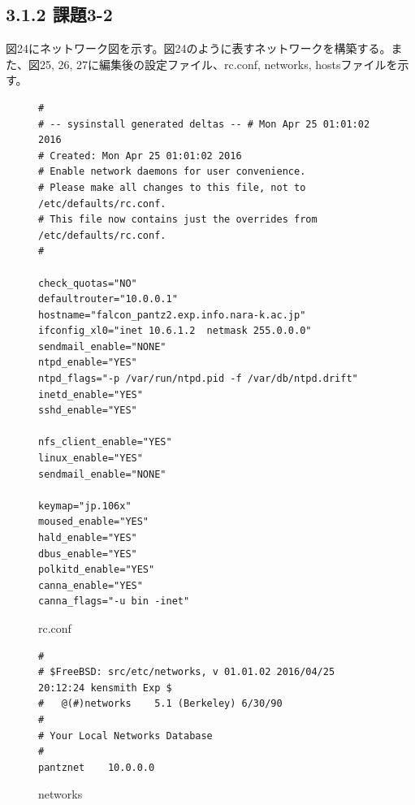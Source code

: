 \documentclass[12pt]{jreport}
\begin{document}
            \subsection*{3.1.2 課題3-2}
                図24にネットワーク図を示す。図24のように表すネットワークを構築する。また、図25, 26, 27に編集後の設定ファイル、rc.conf, networks, hostsファイルを示す。
                \begin{figure}[H]
                    \begin{center}
                        \begin{screen}
                            \begin{verbatim}
#
# -- sysinstall generated deltas -- # Mon Apr 25 01:01:02 2016
# Created: Mon Apr 25 01:01:02 2016 　
# Enable network daemons for user convenience.
# Please make all changes to this file, not to /etc/defaults/rc.conf.
# This file now contains just the overrides from /etc/defaults/rc.conf.
#

check_quotas="NO"
defaultrouter="10.0.0.1"
hostname="falcon_pantz2.exp.info.nara-k.ac.jp"
ifconfig_xl0="inet 10.6.1.2  netmask 255.0.0.0"
sendmail_enable="NONE"
ntpd_enable="YES"
ntpd_flags="-p /var/run/ntpd.pid -f /var/db/ntpd.drift"
inetd_enable="YES"
sshd_enable="YES"

nfs_client_enable="YES"
linux_enable="YES"
sendmail_enable="NONE"

keymap="jp.106x"
moused_enable="YES"
hald_enable="YES"
dbus_enable="YES"
polkitd_enable="YES"
canna_enable="YES"
canna_flags="-u bin -inet"
                            \end{verbatim}
                        \end{screen}
                        \caption{rc.conf}
                        \label{26}
                    \end{center}
                \end{figure}
                \begin{figure}[H]
                    \begin{center}
                        \begin{screen}
                            \begin{verbatim}
#
# $FreeBSD: src/etc/networks, v 01.01.02 2016/04/25 20:12:24 kensmith Exp $
#   @(#)networks    5.1 (Berkeley) 6/30/90
#
# Your Local Networks Database
#
pantznet    10.0.0.0
                            \end{verbatim}
                        \end{screen}
                        \caption{networks}
                        \label{27}
                    \end{center}
                \end{figure}
\end{document}
